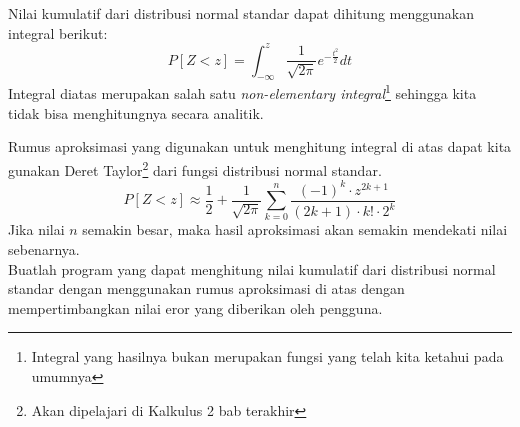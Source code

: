 \documentclass{article}
\begin{document}
\begin{enumerate}[label=]
        Nilai kumulatif dari distribusi normal standar dapat dihitung menggunakan integral berikut:
        \begin{equation*}
            P\left[Z<z\right]=\int_{-\infty}^{z}\dfrac{1}{\sqrt{2\pi}}e^{-\frac{t^2}{2}}dt
        \end{equation*}
        Integral diatas merupakan salah satu \textit{non-elementary integral}\footnote{Integral yang hasilnya bukan merupakan fungsi yang telah kita ketahui pada umumnya} sehingga kita tidak bisa menghitungnya secara analitik.

        Rumus aproksimasi yang digunakan untuk menghitung integral di atas dapat kita gunakan Deret Taylor\footnote{Akan dipelajari di Kalkulus 2 bab terakhir} dari fungsi distribusi normal standar. 
        \begin{equation*}
            P\left[Z<z\right]\approx\frac{1}{2}+\frac{1}{\sqrt{2\pi}}\sum^n_{k=0}\dfrac{(-1)^k\cdot z^{2k+1}}{(2k+1)\cdot k!\cdot 2^k}
        \end{equation*}
        Jika nilai $n$ semakin besar, maka hasil aproksimasi akan semakin mendekati nilai sebenarnya.\\

        Buatlah program yang dapat menghitung nilai kumulatif dari distribusi normal standar dengan menggunakan rumus aproksimasi di atas dengan mempertimbangkan nilai eror yang diberikan oleh pengguna. 


\end{enumerate}
\end{document}
